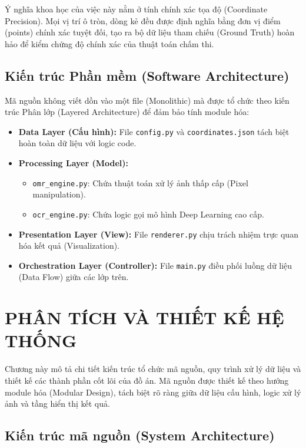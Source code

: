 \documentclass[6pt, a4paper]{report}
\begin{document}
	Ý nghĩa khoa học của việc này nằm ở tính chính xác tọa độ (Coordinate Precision). Mọi vị trí ô tròn, dòng kẻ đều được định nghĩa bằng đơn vị điểm (points) chính xác tuyệt đối, tạo ra bộ dữ liệu tham chiếu (Ground Truth) hoàn hảo để kiểm chứng độ chính xác của thuật toán chấm thi.
	
	\section{Kiến trúc Phần mềm (Software Architecture)}
	Mã nguồn không viết dồn vào một file (Monolithic) mà được tổ chức theo kiến trúc Phân lớp (Layered Architecture) để đảm bảo tính module hóa:
	
	\begin{itemize}
		\item \textbf{Data Layer (Cấu hình):} File \texttt{config.py} và \texttt{coordinates.json} tách biệt hoàn toàn dữ liệu với logic code.
		\item \textbf{Processing Layer (Model):} 
		\begin{itemize}
			\item \texttt{omr\_engine.py}: Chứa thuật toán xử lý ảnh thấp cấp (Pixel manipulation).
			\item \texttt{ocr\_engine.py}: Chứa logic gọi mô hình Deep Learning cao cấp.
		\end{itemize}
		\item \textbf{Presentation Layer (View):} File \texttt{renderer.py} chịu trách nhiệm trực quan hóa kết quả (Visualization).
		\item \textbf{Orchestration Layer (Controller):} File \texttt{main.py} điều phối luồng dữ liệu (Data Flow) giữa các lớp trên.
	\end{itemize}
	
	\chapter{PHÂN TÍCH VÀ THIẾT KẾ HỆ THỐNG}
	
	Chương này mô tả chi tiết kiến trúc tổ chức mã nguồn, quy trình xử lý dữ liệu và thiết kế các thành phần cốt lõi của đồ án. Mã nguồn được thiết kế theo hướng module hóa (Modular Design), tách biệt rõ ràng giữa dữ liệu cấu hình, logic xử lý ảnh và tầng hiển thị kết quả.
	
	\section{Kiến trúc mã nguồn (System Architecture)}
	
\end{document}
